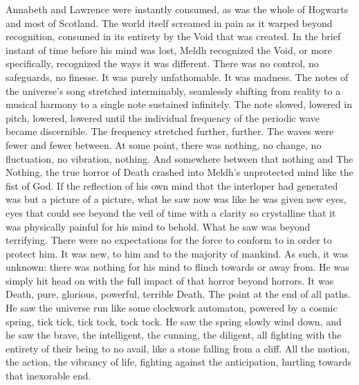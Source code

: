 Annabeth and Lawrence were instantly consumed, as was the whole of Hogwarts and most of Scotland. The world itself screamed in pain as it warped beyond recognition, consumed in its entirety by the Void that was created.
\simpleline
In the brief instant of time before his mind was lost, Meldh recognized the Void, or more specifically, recognized the ways it was different. There was no control, no safeguards, no finesse. It was purely unfathomable. It was madness.
\SmallVSpace
The notes of the universe’s song stretched interminably, seamlessly shifting from reality to a musical harmony to a single note sustained infinitely. The note slowed, lowered in pitch, lowered, lowered until the individual frequency of the periodic wave became discernible. The frequency stretched further, further. The waves were fewer and fewer between. At some point, there was nothing, no change, no fluctuation, no vibration, nothing.
\SmallVSpace
And somewhere between that nothing and The Nothing, the true horror of Death crashed into Meldh’s unprotected mind like the fist of God.
\SmallVSpace
If the reflection of his own mind that the interloper had generated was but a picture of a picture, what he saw now was like he was given new eyes, eyes that could see beyond the veil of time with a clarity so crystalline that it was physically painful for his mind to behold.
\SmallVSpace
What he saw was beyond terrifying. There were no expectations for the force to conform to in order to protect him. It was new, to him and to the majority of mankind. As such, it was unknown: there was nothing for his mind to flinch towards or away from. He was simply hit head on with the full impact of that horror beyond horrors.
\SmallVSpace
It was Death, pure, glorious, powerful, terrible Death. The point at the end of all paths. He saw the universe run like some clockwork automaton, powered by a cosmic spring, tick tick, tick tock, tock tock. He saw the spring slowly wind down, and he saw the brave, the intelligent, the cunning, the diligent, all fighting with the entirety of their being to no avail, like a stone falling from a cliff. All the motion, the action, the vibrancy of life, fighting against the anticipation, hurtling towards that inexorable end.

